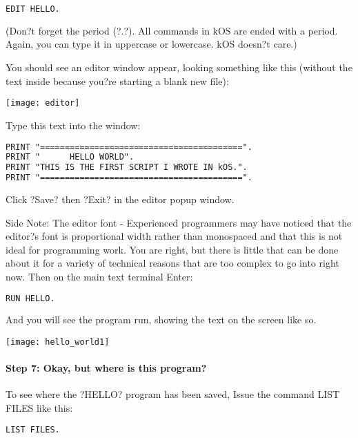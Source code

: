 \begin{lstlisting}[frame=single,language=XML]
EDIT HELLO.
\end{lstlisting} 

(Don?t forget the period (?.?). All commands in kOS are ended with a period. Again, you can type it in uppercase or lowercase. kOS doesn?t care.)

You should see an editor window appear, looking something like this (without the text inside because you?re starting a blank new file):

\begin{center}
\texttt{[image: editor]}
\end{center}

Type this text into the window:

\begin{lstlisting}[frame=single,language=XML]
PRINT "=========================================".
PRINT "      HELLO WORLD".
PRINT "THIS IS THE FIRST SCRIPT I WROTE IN kOS.".
PRINT "=========================================".
\end{lstlisting} 

Click ?Save? then ?Exit? in the editor popup window.

Side Note: The editor font - Experienced programmers may have noticed that the editor?s font is proportional width rather than monospaced and that this is not ideal for programming work. You are right, but there is little that can be done about it for a variety of technical reasons that are too complex to go into right now.
Then on the main text terminal Enter:

\begin{lstlisting}[frame=single,language=XML]
RUN HELLO.
\end{lstlisting} 

And you will see the program run, showing the text on the screen like so.

\begin{center}
\texttt{[image: hello\_world1]}
\end{center}

\paragraph{Step 7: Okay, but where is this program?}
To see where the ?HELLO? program has been saved, Issue the command LIST FILES like this:

\begin{lstlisting}[frame=single,language=XML]
LIST FILES.
\end{lstlisting} 

